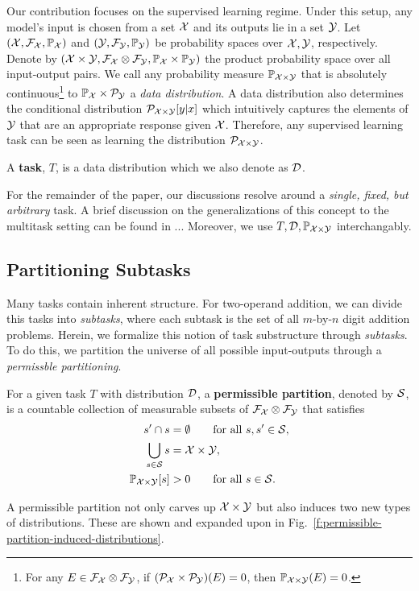 Our contribution focuses on the supervised learning regime. Under this setup,
any model's input is chosen from a set $\mathcal{X}$ and its outputs lie in a set
$\mathcal{Y}$. Let $(\mathcal{X}, \mathcal{F}_{\mathcal{X}}, \mathbb{P}_{\mathcal{X}})$ and $(\mathcal{Y}, \mathcal{F}_{\mathcal{Y}}, \mathbb{P}_{\mathcal{Y}})$ be
probability spaces over $\mathcal{X}, \mathcal{Y}$, respectively. 
Denote by $(\mathcal{X} \times \mathcal{Y},
\mathcal{F}_{\mathcal{X}} \otimes \mathcal{F}_{\mathcal{Y}}, \mathbb{P}_{\mathcal{X}} \times \mathbb{P}_{\mathcal{Y}})$ the product probability
space over all input-output pairs. We call any probability measure 
$\mathbb{P}_{\mathcal{X}\times\mathcal{Y}}$ that is absolutely continuous\footnote{For any
$E \in \mathcal{F}_{\mathcal{X}}\otimes \mathcal{F}_{\mathcal{Y}}$, if $(\mathcal{P}_{\mathcal{X}} \times \mathcal{P}_{\mathcal{Y}})(E) = 0$,
then $\mathbb{P}_{\mathcal{X}\times\mathcal{Y}}(E) = 0$.} to 
$\mathbb{P}_{\mathcal{X}} \times \mathcal{P}_{\mathcal{Y}}$ a \textit{data distribution}. A data distribution
also determines the conditional distribution $\mathcal{P}_{\mathcal{X}\times\mathcal{Y}}[y | x]$
which intuitively captures the elements of $\mathcal{Y}$ that are an appropriate
response given $\mathcal{X}$. Therefore, any supervised learning task can be 
seen as learning the distribution $\mathcal{P}_{\mathcal{X}\times\mathcal{Y}}$. 
\begin{defn}[Task]\label{d:task}
A \textbf{task}, $T$, is a data distribution which we also denote as
$\mathcal{D}$.
\end{defn}
For the remainder of the paper, our discussions resolve around a \textit{
single, fixed, but arbitrary}
 task.  A brief discussion on the generalizations of
this concept to the multitask setting can be found in ...
Moreover, we use $T, \mathcal{D}, \mathbb{P}_{\mathcal{X}\times\mathcal{Y}}$ interchangably.

\subsection{Partitioning Subtasks}\label{s:partitioning-subtasks}
Many tasks contain inherent structure. For two-operand addition, we can
divide this tasks into \textit{subtasks}, where each subtask is the
set of all $m$-by-$n$ digit addition problems. Herein, we formalize
this notion of task substructure through \textit{subtasks}. To do
this, we partition the universe of all possible input-outputs through a 
\textit{permissble partitioning}.
\begin{defn}\label{d:permissible}
For a given task $T$ with distribution $\mathcal{D}$, a \textbf{permissible partition},
denoted by $\mathcal{S}$, is a countable collection of measurable subsets of 
$\mathcal{F}_{\mathcal{X}}\otimes \mathcal{F}_{\mathcal{Y}}$ that satisfies
\begin{align}
s' \cap s &= \emptyset \qquad \text{for all}~s,s' \in \mathcal{S},\\
\bigcup_{s\in \mathcal{S}} s &= \mathcal{X} \times \mathcal{Y}, \\
\mathbb{P}_{\mathcal{X}\times\mathcal{Y}}[s] &> 0 \qquad \text{for all}~s \in \mathcal{S}.
\end{align}
\end{defn}
A permissible partition not only carves up $\mathcal{X} \times \mathcal{Y}$ but also
induces two new types of distributions. These are shown and expanded upon
in Fig.~\ref{f:permissible-partition-induced-distributions}.

